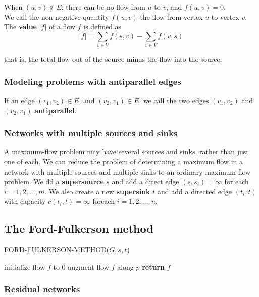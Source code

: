 \documentclass[12pt]{article}
\begin{document}
When $(u,v) \notin E$, there can be no flow from $u$ to $v$, and $f(u,v) = 0$. \\

We call the non-negative quantity $f(u,v)$ the flow from vertex $u$ to vertex $v$. The \textbf{value} $|f|$ of a flow $f$ is defined as
\begin{equation*}
  |f| = \sum_{v \in V} f(s,v) - \sum_{v \in V} f(v,s)
\end{equation*}

that is, the total flow out of the source minus the flow into the source.

\subsubsection{Modeling problems with antiparallel edges}

If an edge $(v_1, v_2) \in E$, and $(v_2, v_1) \in E$, we call the two edges $(v_1, v_2)$ and $(v_2, v_1)$ \textbf{antiparallel}.

\subsubsection{Networks with multiple sources and sinks}

A maximum-flow problem may have several sources and sinks, rather than just one of each. We can reduce the problem of determining a maximum flow in a network with multiple sources and multiple sinks to an ordinary maximum-flow problem. We dd a \textbf{supersource} $s$ and add a direct edge $(s, s_i) = \infty$ for each $i = 1,2,\dots,m$. We also create a new \textbf{supersink} $t$ and add a directed edge $(t_i, t)$ with capacity $c(t_i, t) = \infty$ foreach $i = 1,2,\dots,n$. 

\subsection{The Ford-Fulkerson method}

FORD-FULKERSON-METHOD($G, s, t$)
\begin{algorithmic} [1]
\State initialize flow $f$ to $0$
	\State augment flow $f$ along $p$
\EndWhile
\State \textbf{return } $f$
\end{algorithmic}

\subsubsection*{Residual networks}
\end{document}
